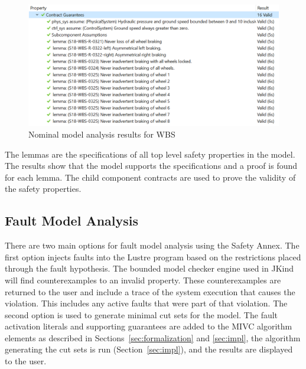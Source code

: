 \begin{figure}[htbp]
	\begin{center}
		\includegraphics[width=.9\textwidth]{images/nominalModelResults.png}
	\end{center}
	\vspace{-0.3in}
	\caption{Nominal model analysis results for WBS}
	\label{fig:analysisResults}
\end{figure}

The lemmas are the specifications of all top level safety properties in the model. The results show that the model supports the specifications and a proof is found for each lemma. The child component contracts are used to prove the validity of the safety properties.

\subsection{Fault Model Analysis}
There are two main options for fault model analysis using the Safety Annex. The first option injects faults into the Lustre program based on the restrictions placed through the fault hypothesis. The bounded model checker engine used in JKind will find counterexamples to an invalid property. These counterexamples are returned to the user and include a trace of the system execution that causes the violation. This includes any active faults that were part of that violation. The second option is used to generate minimal cut sets for the model. The fault activation literals and supporting guarantees are added to the MIVC algorithm elements as described in Sections~\ref{sec:formalization} and \ref{sec:impl}, the algorithm generating the cut sets is run (Section~\ref{sec:impl}), and the results are displayed to the user. 


